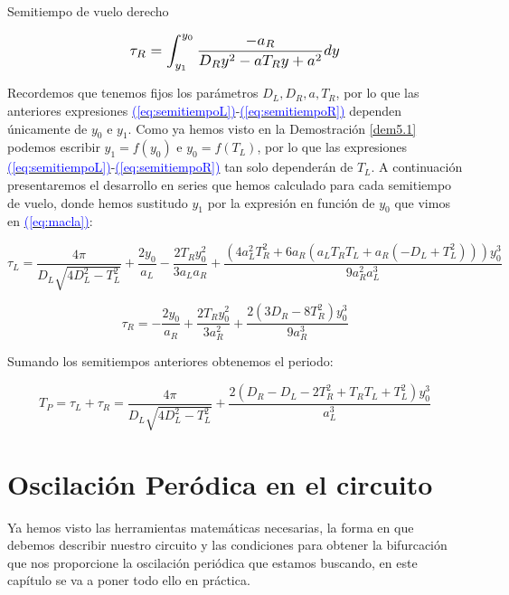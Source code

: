 \documentclass[12pt,a4paper]{report} %
\newcommand{\eref}[1]{\hyperref[#1]{\textcolor{blue}{(\ref*{#1})}}}
\newcommand{\eref}[1]{\hyperref[#1]{\textcolor{blue}{\textit{(\ref*{#1})}}}}
\begin{document}
	\vspace{0.5cm}\noindent Semitiempo de vuelo derecho
	
	\begin{equation}
		\label{eq:semitiempoR}
		\scalebox{1.2}{$\displaystyle
		\tau_R=\int_{y_1}^{y_0}\frac{-a_R}{D_Ry^2-aT_Ry+a^2}dy
		$}
	\end{equation}\smallskip
	
	\vspace{0.5cm} Recordemos que tenemos fijos los parámetros $D_L,D_R,a,T_R$, por lo que las anteriores expresiones \eref{eq:semitiempoL}-\eref{eq:semitiempoR} dependen únicamente de $y_0$ e $y_1$. Como ya hemos visto en la Demostración \ref{dem5.1} podemos escribir $y_1=f(y_0)$ e $y_0=f(T_L)$, por lo que las expresiones \eref{eq:semitiempoL}-\eref{eq:semitiempoR} tan solo dependerán de $T_L$. A continuación presentaremos el desarrollo en series que hemos calculado para cada semitiempo de vuelo, donde hemos sustitudo $y_1$ por la expresión en función de $y_0$ que vimos en \eref{eq:macla}:
	
	\begin{equation}
		\label{eq:seriestL}
		\tau_L=\frac{4\pi}{D_L\sqrt{4D_L^2-T_L^2}}+\frac{2y_0}{a_L}-\frac{2T_Ry_0^2}{3a_La_R}+\frac{(4a_L^2T_R^2+6a_R(a_LT_RT_L+a_R(-D_L+T_L^2)))y_0^3}{9a_R^2a_L^3}
	\end{equation}\smallskip
	
	\vspace{0.5cm}
	
	\begin{equation}
		\label{eq:seriestR}
		\tau_R=-\frac{2y_0}{a_R}+\frac{2T_Ry_0^2}{3a_R^2}+\frac{2(3D_R-8T_R^2)y_0^3}{9a_R^3}
	\end{equation}\smallskip
	
	\vspace{0.5cm}\noindent Sumando los semitiempos anteriores obtenemos el periodo:
	
	\begin{equation}
		T_P=\tau_L + \tau_R = \frac{4\pi}{D_L\sqrt{4D_L^2-T_L^2}}+\frac{2(D_R-D_L-2T_R^2+T_RT_L+T_L^2)y_0^3}{a_L^3}
	\end{equation}
	
	\newpage
	
	\chapter{Oscilación Peródica en el circuito}
	
	Ya hemos visto las herramientas matemáticas necesarias, la forma en que debemos describir nuestro circuito y las condiciones para obtener la bifurcación que nos proporcione la oscilación periódica que estamos buscando, en este capítulo se va a poner todo ello en práctica.
	
\end{document}
